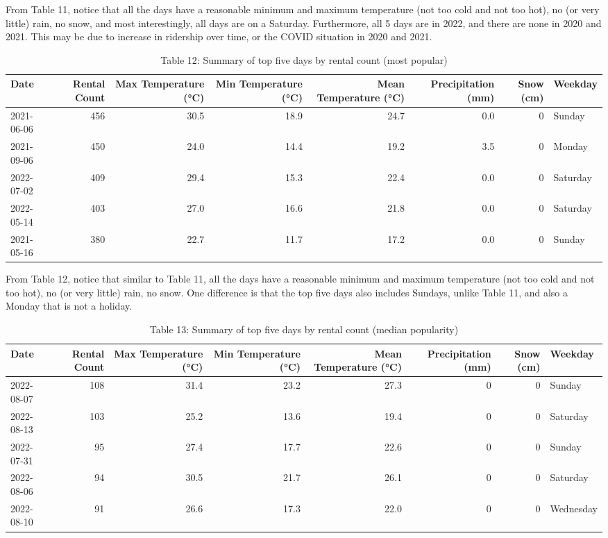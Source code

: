 \documentclass[
]{article}
\begin{document}
From Table 11, notice that all the days have a reasonable minimum and
maximum temperature (not too cold and not too hot), no (or very little)
rain, no snow, and most interestingly, all days are on a Saturday.
Furthermore, all 5 days are in 2022, and there are none in 2020 and
2021. This may be due to increase in ridership over time, or the COVID
situation in 2020 and 2021.

\begin{table}[!h]

\caption{\label{tab:Table 12 conditions for maximum bike share riders (most popular)}Table 12: Summary of top five days by rental count (most popular)}
\centering
\begin{tabular}[t]{l|r|r|r|r|r|r|l}
\hline
Date & Rental Count & Max Temperature (°C) & Min Temperature (°C) & Mean Temperature (°C) & Precipitation (mm) & Snow (cm) & Weekday\\
\hline
2021-06-06 & 456 & 30.5 & 18.9 & 24.7 & 0.0 & 0 & Sunday\\
\hline
2021-09-06 & 450 & 24.0 & 14.4 & 19.2 & 3.5 & 0 & Monday\\
\hline
2022-07-02 & 409 & 29.4 & 15.3 & 22.4 & 0.0 & 0 & Saturday\\
\hline
2022-05-14 & 403 & 27.0 & 16.6 & 21.8 & 0.0 & 0 & Saturday\\
\hline
2021-05-16 & 380 & 22.7 & 11.7 & 17.2 & 0.0 & 0 & Sunday\\
\hline
\end{tabular}
\end{table}

From Table 12, notice that similar to Table 11, all the days have a
reasonable minimum and maximum temperature (not too cold and not too
hot), no (or very little) rain, no snow. One difference is that the top
five days also includes Sundays, unlike Table 11, and also a Monday that
is not a holiday.

\begin{table}[!h]

\caption{\label{tab:Table 13 conditions for maximum bike share riders (median popular)}Table 13: Summary of top five days by rental count (median popularity)}
\centering
\begin{tabular}[t]{l|r|r|r|r|r|r|l}
\hline
Date & Rental Count & Max Temperature (°C) & Min Temperature (°C) & Mean Temperature (°C) & Precipitation (mm) & Snow (cm) & Weekday\\
\hline
2022-08-07 & 108 & 31.4 & 23.2 & 27.3 & 0 & 0 & Sunday\\
\hline
2022-08-13 & 103 & 25.2 & 13.6 & 19.4 & 0 & 0 & Saturday\\
\hline
2022-07-31 & 95 & 27.4 & 17.7 & 22.6 & 0 & 0 & Sunday\\
\hline
2022-08-06 & 94 & 30.5 & 21.7 & 26.1 & 0 & 0 & Saturday\\
\hline
2022-08-10 & 91 & 26.6 & 17.3 & 22.0 & 0 & 0 & Wednesday\\
\hline
\end{tabular}
\end{table}
\end{document}

